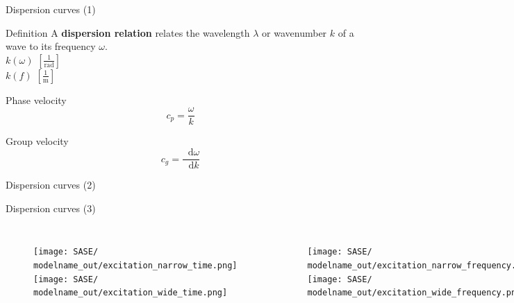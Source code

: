 \documentclass[10pt]{beamer} %
\DeclareRobustCommand*{\drv}{\mathop{}\!\mathrm{d}}
\begin{document}
\begin{frame}[label=frame4]{Dispersion curves (1)}
	\begin{alertblock}{Definition}
		A \textbf{dispersion relation} relates the wavelength $\lambda$ or wavenumber $k$ of a wave to its frequency $\omega$.\\
		 \vspace{10pt}
		$k(\omega)$ $[\frac{1}{\mathrm{rad}}]$\\
			 \vspace{6pt}
		$k(f)$ $[\frac{1}{\mathrm{m}}]$
	\end{alertblock}
	\begin{block}{Phase velocity}
		\begin{equation*}
			c_p = \frac{\omega}{k}
		\end{equation*}
	\end{block}
\begin{block}{Group velocity}
	\begin{equation*}
	c_g = \frac{\drv \omega}{\drv k}
	\end{equation*}
\end{block}
\end{frame}
\begin{frame}[label=frame5]{Dispersion curves (2)}
\newcommand{\modelname}{SASE2}
	\begin{figure}
	\end{figure}
\end{frame}
\begin{frame}[label=frame6]{Dispersion curves (3)}
\def\myindenta{0.17\textwidth} %
\begin{columns}[T]
	\newcommand{\modelname}{dispersion_effect}
	\begin{figure}
		\texttt{[image: SASE/\\modelname\_out/excitation\_narrow\_time.png]}
		\texttt{[image: SASE/\\modelname\_out/excitation\_wide\_time.png]}
	\end{figure}
	\newcommand{\modelname}{dispersion_effect}
	\begin{figure}
			\texttt{[image: SASE/\\modelname\_out/excitation\_narrow\_frequency.png]}
			\texttt{[image: SASE/\\modelname\_out/excitation\_wide\_frequency.png]}
	\end{figure}
\end{columns}
\end{frame}
\end{document}
